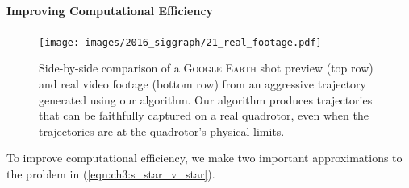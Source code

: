 
\paragraph{Improving Computational Efficiency}

\begin{figure}[t]
\centering
\texttt{[image: images/2016\_siggraph/21\_real\_footage.pdf]}
\caption{
Side-by-side comparison of a \textsc{Google Earth} shot preview (top row) and real video footage (bottom row) from an aggressive trajectory generated using our algorithm.
Our algorithm produces trajectories that can be faithfully captured on a real quadrotor, even when the trajectories are at the quadrotor's physical limits.
}
\label{fig:ch3:real}
\end{figure}

To improve computational efficiency, we make two important approximations to the problem in (\ref{eqn:ch3:s_star_v_star}).


